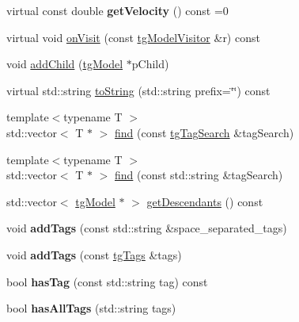 \begin{DoxyCompactItemize}
\item 
\hypertarget{classtg_base_string_a3001e3971717f3a803b1915590a1a4b0}{virtual const double {\bfseries get\-Velocity} () const =0}\label{classtg_base_string_a3001e3971717f3a803b1915590a1a4b0}

\item 
virtual void \hyperlink{classtg_model_aee6457e0fc54d5570b87bfc779f9b1c0}{on\-Visit} (const \hyperlink{classtg_model_visitor}{tg\-Model\-Visitor} \&r) const 
\item 
void \hyperlink{classtg_model_a292c17848b96caee32b2286e44c13f2f}{add\-Child} (\hyperlink{classtg_model}{tg\-Model} $\ast$p\-Child)
\item 
virtual std\-::string \hyperlink{classtg_model_af37b0c1a6d4060bfe0bb9b5038a17725}{to\-String} (std\-::string prefix=\char`\"{}\char`\"{}) const 
\item 
{\footnotesize template$<$typename T $>$ }\\std\-::vector$<$ T $\ast$ $>$ \hyperlink{classtg_model_ab75836fdfbd9200f165c3b28a19630c0}{find} (const \hyperlink{classtg_tag_search}{tg\-Tag\-Search} \&tag\-Search)
\item 
{\footnotesize template$<$typename T $>$ }\\std\-::vector$<$ T $\ast$ $>$ \hyperlink{classtg_model_aa40b5fb32f8941e04d537f4e6c6db35c}{find} (const std\-::string \&tag\-Search)
\item 
std\-::vector$<$ \hyperlink{classtg_model}{tg\-Model} $\ast$ $>$ \hyperlink{classtg_model_a2efa4321fa5c77b4ce23b01f6fd3a1c4}{get\-Descendants} () const 
\item 
\hypertarget{classtg_taggable_af0b8f1729653b0b90d2fecbd51163612}{void {\bfseries add\-Tags} (const std\-::string \&space\-\_\-separated\-\_\-tags)}\label{classtg_taggable_af0b8f1729653b0b90d2fecbd51163612}

\item 
\hypertarget{classtg_taggable_af28e3fe1a7e4eb28772dc006d575dd1f}{void {\bfseries add\-Tags} (const \hyperlink{classtg_tags}{tg\-Tags} \&tags)}\label{classtg_taggable_af28e3fe1a7e4eb28772dc006d575dd1f}

\item 
\hypertarget{classtg_taggable_ae31f65869c8887bfeb34a344902c4d5b}{bool {\bfseries has\-Tag} (const std\-::string tag) const }\label{classtg_taggable_ae31f65869c8887bfeb34a344902c4d5b}

\item 
\hypertarget{classtg_taggable_a33b77b1075171b63f673965687b2e844}{bool {\bfseries has\-All\-Tags} (std\-::string tags)}\label{classtg_taggable_a33b77b1075171b63f673965687b2e844}


\end{DoxyCompactItemize}
